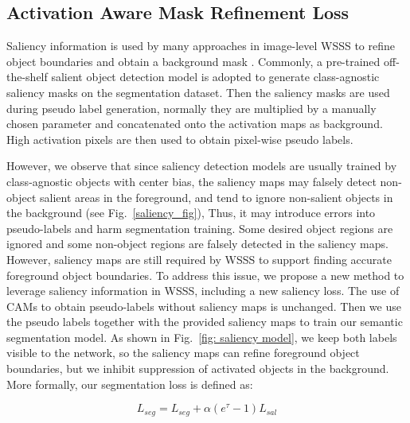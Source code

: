 \documentclass[10pt,twocolumn,letterpaper]{article}
\begin{document}
\subsection{Activation Aware Mask Refinement Loss}
Saliency information is used by many approaches in image-level WSSS to refine object boundaries and obtain a background mask
\cite{sun2020mining, jiang2019integral, lee2019ficklenet, fan2020cian, fan2018associating, hou2018self, huang2018weakly, wei2018revisiting, wang2018weakly}.
Commonly, a pre-trained off-the-shelf salient object detection model is adopted to generate class-agnostic saliency masks on the segmentation dataset. 
Then the saliency masks are used during pseudo label generation, normally they
are multiplied by a manually chosen parameter and concatenated onto the activation maps as background. High activation pixels are then used to obtain pixel-wise 
pseudo labels.




However, we observe that since saliency detection models are usually trained by class-agnostic objects with center bias,
the saliency maps may falsely detect non-object salient areas in the foreground, and tend to
ignore non-salient objects in the background (see Fig.~\ref{saliency_fig}),
Thus, it may introduce errors into pseudo-labels and harm segmentation training. 
Some desired object regions are ignored and some non-object regions are falsely detected in the saliency maps.
However, saliency maps are still required by WSSS to support finding accurate foreground object boundaries.
To address this issue, we propose a new method to leverage  saliency information in WSSS, including a new saliency loss.
The use of CAMs to obtain pseudo-labels without saliency maps is unchanged.
Then we use the
pseudo labels together with the provided saliency maps to 
train our semantic segmentation model.
As shown in Fig.~\ref{fig: saliency model},
we keep both labels visible to the network, 
so the saliency maps can refine foreground object boundaries, 
but we inhibit suppression of 
activated objects in the background.
More formally, our segmentation loss is defined as:

\begin{equation}
\label{eq: seg_loss}
    L_{seg} = L_{seg} + \alpha (e^{\tau}-1) L_{sal} 
\end{equation}
\vspace{-3mm}
\end{document}
